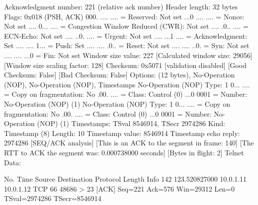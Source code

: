     Acknowledgment number: 221    (relative ack number)
    Header length: 32 bytes
    Flags: 0x018 (PSH, ACK)
        000. .... .... = Reserved: Not set
        ...0 .... .... = Nonce: Not set
        .... 0... .... = Congestion Window Reduced (CWR): Not set
        .... .0.. .... = ECN-Echo: Not set
        .... ..0. .... = Urgent: Not set
        .... ...1 .... = Acknowledgment: Set
        .... .... 1... = Push: Set
        .... .... .0.. = Reset: Not set
        .... .... ..0. = Syn: Not set
        .... .... ...0 = Fin: Not set
    Window size value: 227
    [Calculated window size: 29056]
    [Window size scaling factor: 128]
    Checksum: 0x5071 [validation disabled]
        [Good Checksum: False]
        [Bad Checksum: False]
    Options: (12 bytes), No-Operation (NOP), No-Operation (NOP), Timestamps
        No-Operation (NOP)
            Type: 1
                0... .... = Copy on fragmentation: No
                .00. .... = Class: Control (0)
                ...0 0001 = Number: No-Operation (NOP) (1)
        No-Operation (NOP)
            Type: 1
                0... .... = Copy on fragmentation: No
                .00. .... = Class: Control (0)
                ...0 0001 = Number: No-Operation (NOP) (1)
        Timestamps: TSval 8546914, TSecr 2974286
            Kind: Timestamp (8)
            Length: 10
            Timestamp value: 8546914
            Timestamp echo reply: 2974286
    [SEQ/ACK analysis]
        [This is an ACK to the segment in frame: 140]
        [The RTT to ACK the segment was: 0.000738000 seconds]
        [Bytes in flight: 2]
Telnet
    Data: 

No.     Time           Source                Destination           Protocol Length Info
    142 123.520827000  10.0.1.11             10.0.1.12             TCP      66     48686 > 23 [ACK] Seq=221 Ack=576 Win=29312 Len=0 TSval=2974286 TSecr=8546914

